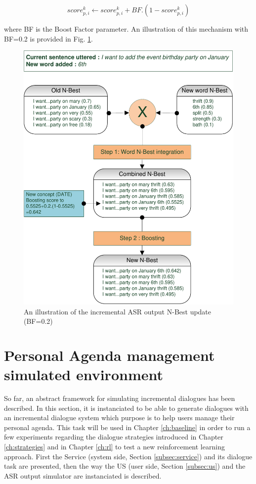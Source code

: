 						$$ score^k_{p,i} \leftarrow score^k_{p,i} + BF.(1 - score^k_{p,i}) $$
							
					where BF is the Boost Factor parameter. An illustration of this mechanism with BF=0.2 is provided in Fig. \ref{fig:asrsimu}.
					
					\begin{figure}[h]
						\centering
						\includegraphics[scale=0.75]{figures/ASRSimu.pdf}
						\caption{An illustration of the incremental ASR output N-Best update (BF=0.2)}
						\label{fig:asrsimu}
					\end{figure}

\section{Personal Agenda management simulated environment}

	So far, an abstract framework for simulating incremental dialogues has been described. In this section, it is instanciated to be able to generate dialogues with an incremental dialogue system which purpose is to help users manage their personal agenda. This task will be used in Chapter \ref{ch:baseline} in order to run a few experiments regarding the dialogue strategies introduced in Chapter \ref{ch:strategies} and in Chapter \ref{ch:rl} to test a new reinforcement learning approach. First the Service (system side, Section \ref{subsec:service}) and its dialogue task are presented, then the way the US (user side, Section \ref{subsec:us}) and the ASR output simulator are instanciated is described.
	
